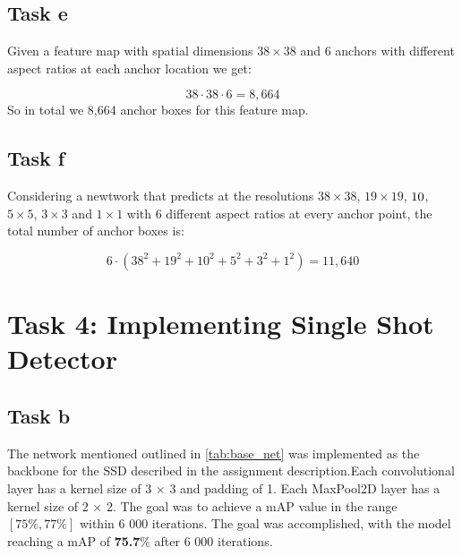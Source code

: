 \documentclass{article}
\begin{document}
\subsection{Task e}

Given a feature map with spatial dimensions $38 \times 38$ and 6 anchors with different aspect ratios at each anchor location we get:

\begin{equation}
    38 \cdot 38 \cdot 6 = 8,664
\end{equation}
So in total we 8,664 anchor boxes for this feature map.



\subsection{Task f}
Considering a newtwork that predicts at the resolutions $38 \times 38$, $19 \times 19$, $10 \time 10$, $5 \times 5$, $3 \times 3$ and $1 \times 1$ with 6 different aspect ratios at every anchor point, the total number of anchor boxes is:

\begin{equation}
    6\cdot(38^2 + 19^2 + 10^2 + 5^2 + 3^2 + 1^2) = 11,640
\end{equation}


\section{Task 4: Implementing Single Shot Detector}


\subsection{Task b}
The network mentioned outlined in \autoref{tab:base_net} was implemented as the backbone for the SSD described in the assignment description.Each convolutional layer has a kernel size of 3 × 3 and padding of 1. Each MaxPool2D layer has a kernel size of 2 × 2. The goal was to achieve a mAP value in the range $[75\%,77\%]$ within 6 000 iterations. The goal was accomplished, with the model reaching a mAP of \textbf{75.7}\% after 6 000 iterations. 
\end{document}
